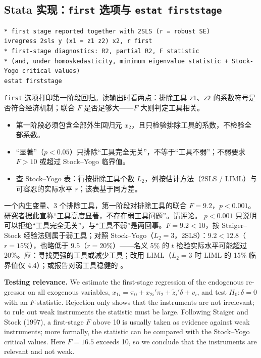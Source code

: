 \subsection{Stata 实现：\texttt{first} 选项与 \texttt{estat firststage}}

\begin{lstlisting}
* first stage reported together with 2SLS (r = robust SE)
ivregress 2sls y (x1 = z1 z2) x2, r first
* first-stage diagnostics: R2, partial R2, F statistic
* (and, under homoskedasticity, minimum eigenvalue statistic + Stock-Yogo critical values)
estat firststage
\end{lstlisting}
\texttt{first} 选项打印第一阶段回归。读输出时看两点：排除工具 \texttt{z1}、\texttt{z2} 的系数符号是否符合经济机制；联合 $F$ 是否足够大——$F$ 大则判定工具相关。

\begin{note}[相关性检验的易错点]
\begin{itemize}
  \item 第一阶段必须包含全部外生回归元 $x_2$，且只检验排除工具的系数，不检验全部系数。
  \item “显著”（$p<0.05$）只排除“工具完全无关”，不等于“工具不弱”；不弱要求 $F>10$ 或超过 Stock--Yogo 临界值。
  \item 查 Stock--Yogo 表：行按排除工具个数 $L_2$，列按估计方法（2SLS / LIML）与可容忍的实际水平 $r$；该表基于同方差。
\end{itemize}
\end{note}

\begin{prac}[第一阶段判断]\label{pr:U09-weak}
一个内生变量、3 个排除工具，第一阶段对排除工具的联合 $F=9.2$，$p<0.001$。研究者据此宣称“工具高度显著，不存在弱工具问题”。请评论。
\answer
$p<0.001$ 只说明可以拒绝“工具完全无关”，与“工具不弱”是两回事。$F=9.2<10$，按 Staiger--Stock 经验法则属于弱工具；对照 Stock--Yogo（$L_2=3$，2SLS）：$9.2<12.8$（$r=15\%$），也略低于 $9.5$（$r=20\%$）——名义 5\% 的 $t$ 检验实际水平可能超过 20\%。应：寻找更强的工具或减少工具；改用 LIML（$L_2=3$ 时 LIML 的 15\% 临界值仅 4.4）；或报告对弱工具稳健的 。
\end{prac}

\begin{english}
\textbf{Testing relevance.} We estimate the first-stage regression of the endogenous regressor on all exogenous variables, $x_{1i}=\pi_0+x_{2i}'\pi_2+\tilde z_i'\delta+v_i$, and test $H_0:\delta=0$ with an $F$-statistic. Rejection only shows that the instruments are not irrelevant; to rule out weak instruments the statistic must be large. Following Staiger and Stock (1997), a first-stage $F$ above 10 is usually taken as evidence against weak instruments; more formally, the statistic can be compared with the Stock--Yogo critical values. Here $F=16.5$ exceeds 10, so we conclude that the instruments are relevant and not weak.
\end{english}

